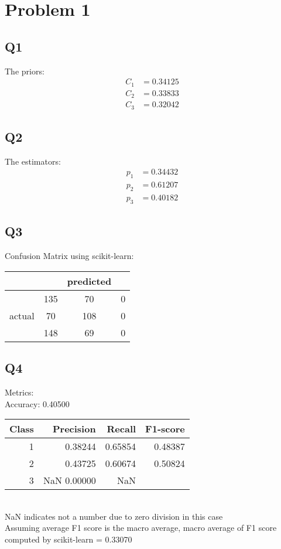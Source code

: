\documentclass{subfiles}
\begin{document}
  \section{Problem 1}
  \subsection{Q1}
  The priors:
  \begin{equation*}
    \begin{split}
      C_1 &= 0.34125\\
      C_2 &= 0.33833\\
      C_3 &= 0.32042
    \end{split}
  \end{equation*}
  \subsection{Q2}
  The estimators:
  \begin{equation*}
    \begin{split}
      p_1 &= 0.34432\\
      p_2 &= 0.61207\\
      p_3 &= 0.40182
    \end{split}
  \end{equation*}
  \subsection{Q3}
  Confusion Matrix using scikit-learn:
  \begin{tabular}{|c|c|c|c|}
    \hline
     & & predicted & \\
    \hline
    & 135 & 70 & 0\\
    \hline
    actual & 70 & 108 & 0\\
    \hline
    & 148 & 69 & 0\\
    \hline
  \end{tabular}\cite{scikit-learn}
  \subsection{Q4}
  Metrics:\\
  Accuracy: 0.40500\\
  \begin{tabular}{|r|r|r|r|}
    \hline
    Class & Precision & Recall & F1-score\\
    \hline
    1 & 0.38244 & 0.65854 & 0.48387\\
    \hline
    2 & 0.43725 & 0.60674 & 0.50824\\
    \hline
    3 & NaN 0.00000 & NaN\\
    \hline
  \end{tabular}\cite{2020SciPy-NMeth}\\
  NaN indicates not a number due to zero division in this case\\
  Assuming average F1 score is the macro average, macro average of F1 score computed by scikit-learn = 0.33070\cite{scikit-learn}
\end{document}
